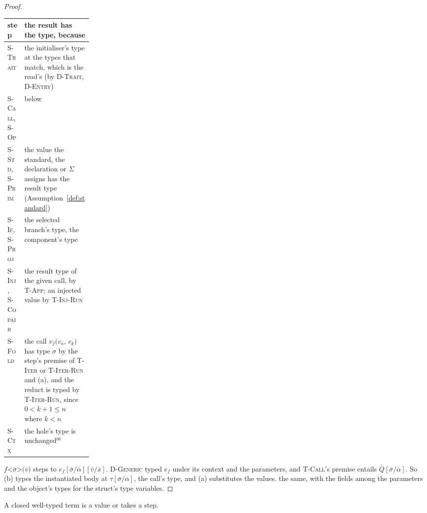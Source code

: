 \begin{proof}
\begingroup
\small
\begin{longtable}{@{}>{\raggedright\arraybackslash}p{0.2\linewidth}>{\raggedright\arraybackslash}p{}@{}}
\toprule
step & the result has the type, because \\
\midrule
\endhead
\bottomrule
\endlastfoot
\textsc{S-Trait} & the initialiser's type at the types that match, which is the read's (by \textsc{D-Trait}, \textsc{D-Entry}) \\
\textsc{S-Call}, \textsc{S-Op} & below \\
\textsc{S-Std}, \textsc{S-Prim} & the value the standard, the declaration or $\Sigma$ assigns has the result type (Assumption~\ref{def:standard}) \\
\textsc{S-If}, \textsc{S-Proj} & the selected branch's type, the component's type \\
\textsc{S-Inj}, \textsc{S-Copair} & the result type of the given call, by \textsc{T-App}; an injected value by \textsc{T-Inj-Run} \\
\textsc{S-Fold} & the call $v_f\texttt{(}v_a\texttt{, }c_k\texttt{)}$ has type $\sigma$ by the step's premise of \textsc{T-Iter} or \textsc{T-Iter-Run} and (a), and the reduct is typed by \textsc{T-Iter-Run}, since $0 < k + 1 \le n$ where $k < n$ \\
\textsc{S-Ctx} & the hole's type is unchanged${}^{\textsc{ih}}$ \\
\end{longtable}
\addtocounter{table}{-1}
\endgroup
{}$f\texttt{<}\overline{\sigma}\texttt{>(}\overline{v}\texttt{)}$ steps to $e_f[\overline{\sigma}/\overline{\alpha}][\overline{v}/\overline{x}]$.
\textsc{D-Generic} typed $e_f$ under its context and the parameters, and \textsc{T-Call}'s premise entails $\overline{Q}[\overline{\sigma}/\overline{\alpha}]$.
So (b) types the instantiated body at $\tau[\overline{\sigma}/\overline{\alpha}]$, the call's type, and (a) substitutes the values.
the same, with the fields among the parameters and the object's types for the struct's type variables.
\end{proof}

\begin{lemma}[Progress]
\label{lem:progress}
A closed well-typed term is a value or takes a step.
\end{lemma}

